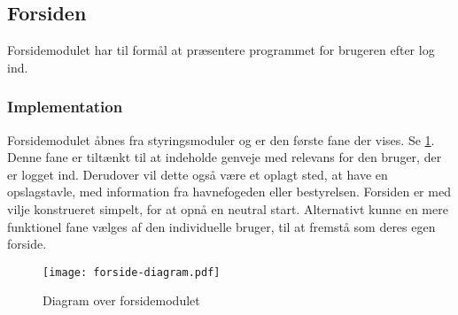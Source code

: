 \subsection{Forsiden}
\label{sub:Welcome}

Forsidemodulet har til formål at præsentere programmet for brugeren efter log ind.

\subsubsection{Implementation}
\label{ssub:Welcome_implementation}
Forsidemodulet åbnes fra styringsmoduler og er den første fane der vises. Se \cref{fig:forsidemod}. Denne fane er tiltænkt til at indeholde genveje med relevans for den bruger, der er logget ind. Derudover vil dette også være et oplagt sted, at have en opslagstavle, med  information fra havnefogeden eller bestyrelsen. Forsiden er med vilje konstrueret simpelt, for at opnå en neutral start. Alternativt kunne en mere funktionel fane vælges af den individuelle bruger, til at fremstå som deres egen forside.

\begin{figure}[h!]
  \centering
  \texttt{[image: forside-diagram.pdf]}
  \caption{Diagram over forsidemodulet} \label{fig:forsidemod}
\end{figure}
